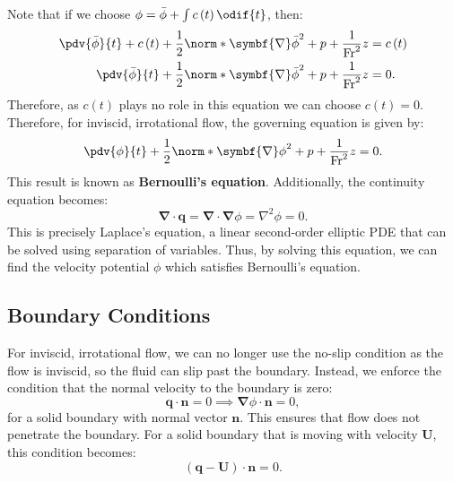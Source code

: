 \documentclass{article}
\theoremstyle{definition}
\begin{document}
Note that if we choose
\(\phi = \bar{\phi} + \int c\left( t \right) \odif{t}\), then:
\begin{align*}
    \pdv{\bar{\phi}}{t} + c\left( t \right) + \frac{1}{2} \norm*{\symbf{\nabla} \bar{\phi}}^2 + p + \frac{1}{\mathrm{Fr}^2} z & = c\left( t \right) \\
    \pdv{\bar{\phi}}{t} + \frac{1}{2} \norm*{\symbf{\nabla} \bar{\phi}}^2 + p + \frac{1}{\mathrm{Fr}^2} z                     & = 0.
\end{align*}
Therefore, as \(c\left( t \right)\) plays no role in this equation
we can choose \(c\left( t \right) = 0\). Therefore, for inviscid,
irrotational flow, the governing equation is given by:
\begin{equation*}
    \pdv{\phi}{t} + \frac{1}{2} \norm*{\symbf{\nabla} \phi}^2 + p + \frac{1}{\mathrm{Fr}^2} z = 0.
\end{equation*}
This result is known as \textbf{Bernoulli's equation}. Additionally,
the continuity equation becomes:
\begin{equation*}
    \symbf{\nabla} \cdot \symbf{q} = \symbf{\nabla} \cdot \symbf{\nabla} \phi = \nabla^2 \phi = 0.
\end{equation*}
This is precisely Laplace's equation, a linear second-order elliptic
PDE that can be solved using separation of variables. Thus, by solving
this equation, we can find the velocity potential \(\phi\) which satisfies
Bernoulli's equation.
\subsection{Boundary Conditions}
For inviscid, irrotational flow, we can no longer use the no-slip
condition as the flow is inviscid, so the fluid can slip past the
boundary. Instead, we enforce the condition that the normal velocity to
the boundary is zero:
\begin{equation*}
    \symbf{q} \cdot \symbf{n} = 0 \implies \symbf{\nabla} \phi \cdot \symbf{n} = 0,
\end{equation*}
for a solid boundary with normal vector \(\symbf{n}\). This ensures that
flow does not penetrate the boundary. For a solid boundary that is
moving with velocity \(\symbf{U}\), this condition
becomes:
\begin{equation*}
    \left( \symbf{q} - \symbf{U} \right) \cdot \symbf{n} = 0.
\end{equation*}
\end{document}
